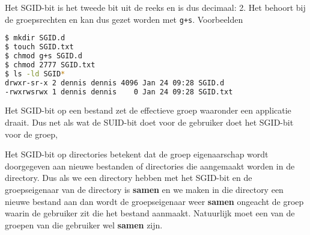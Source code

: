 Het SGID-bit is het tweede bit uit de reeks en is dus decimaal: 2. Het behoort bij de groepsrechten en kan dus gezet worden met \texttt{g+s}. Voorbeelden
\begin{lstlisting}[language=bash]
$ mkdir SGID.d
$ touch SGID.txt
$ chmod g+s SGID.d
$ chmod 2777 SGID.txt
$ ls -ld SGID*
drwxr-sr-x 2 dennis dennis 4096 Jan 24 09:28 SGID.d
-rwxrwsrwx 1 dennis dennis    0 Jan 24 09:28 SGID.txt
\end{lstlisting}

Het SGID-bit op een bestand zet de effectieve groep waaronder een applicatie draait. Dus net als wat de SUID-bit doet voor de gebruiker doet het SGID-bit voor de groep,

Het SGID-bit op directories betekent dat de groep eigenaarschap wordt doorgegeven aan nieuwe bestanden of directories die aangemaakt worden in de directory. Dus als we een directory hebben met het SGID-bit en de groepseigenaar van de directory is \textbf{samen} en we maken in die directory een nieuwe bestand aan dan wordt de groepseigenaar weer \textbf{samen} ongeacht de groep waarin de gebruiker zit die het bestand aanmaakt. Natuurlijk moet een van de groepen van die gebruiker wel \textbf{samen} zijn. 

